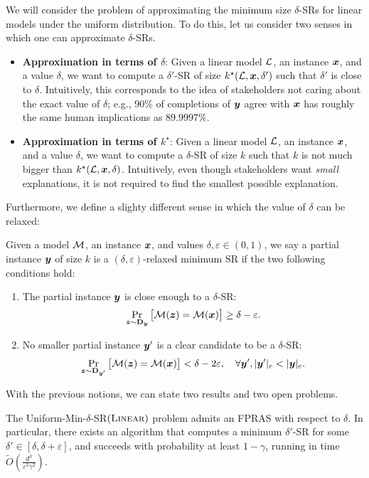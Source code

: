 We will consider the problem of approximating the minimum size $\delta$-SRs for linear models under the uniform distribution. To do this, let us consider two senses in which one can approximate $\delta$-SRs.
\begin{itemize}
    \item \textbf{Approximation in terms of $\delta$}: Given a linear model $\mathcal{L}$, an instance ${\bm{x}}$, and a value $\delta$, we want to compute a $\delta'$-SR of size $k^\star(\mathcal{L}, {\bm{x}}, \delta')$ such that $\delta'$ is close to $\delta$. Intuitively, this corresponds to the idea of stakeholders not caring about the exact value of $\delta$; e.g., $90\%$ of completions of ${\bm{y}}$ agree with ${\bm{x}}$ has roughly the same human implications as $89.9997\%$.
    \item \textbf{Approximation in terms of $k^\star$}: Given a linear model $\mathcal{L}$, an instance ${\bm{x}}$, and a value $\delta$, we want to compute a $\delta$-SR of size $k$ such that $k$ is not much bigger than $k^\star(\mathcal{L}, {\bm{x}}, \delta)$. Intuitively, even though stakeholders want \emph{small} explanations, it is not required to find the smallest possible explanation.
\end{itemize}

Furthermore, we define a slighty different sense in which the value of $\delta$ can be relaxed:

\begin{definition}
    Given a model $\mathcal{M}$, an instance ${\bm{x}}$, and values $\delta, \varepsilon \in (0, 1)$, we say a partial instance ${\bm{y}}$ of size $k$ is a $(\delta, \varepsilon)$-relaxed minimum SR if the two following conditions hold:
    \begin{enumerate}
        \item The partial instance ${\bm{y}}$ is close enough to a $\delta$-SR:
        \[
            \Pr_{{\bm{z}} \sim \mathbf{D}_{{\bm{y}}}}\big[\mathcal{M}({\bm{z}}) = \mathcal{M}({\bm{x}})\big] \geq \delta - \varepsilon.
        \]
        \item No smaller partial instance ${\bm{y}}'$ is a clear candidate to be a $\delta$-SR:
        \[
            \Pr_{{\bm{z}} \sim \mathbf{D}_{{\bm{y}}'}}\big[\mathcal{M}({\bm{z}}) = \mathcal{M}({\bm{x}})\big] < \delta - 2\varepsilon, \quad \forall {\bm{y}}', |{\bm{y}}'|_e < |{\bm{y}}|_e.
        \]
    \end{enumerate}
\end{definition}


With the previous notions, we can state two results and two open problems.
\begin{theorem}\label{thm:delta-approximation}
    The Uniform-Min-$\delta$-SR$(\textsc{Linear})$ problem admits an FPRAS with respect to $\delta$. In particular, there exists an algorithm that computes a minimum $\delta'$-SR for some $\delta' \in [\delta, \delta + \varepsilon]$, and succeeds with probability at least $1-\gamma$, running in time $\tilde{O}\left(\frac{d^3}{\varepsilon^2\gamma^2}\right)$.
\end{theorem}

